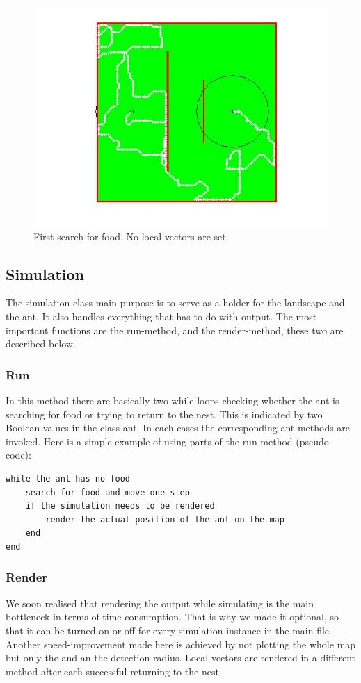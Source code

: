 \documentclass[11pt]{article}
\begin{document}
\begin{figure}[h!]
	\centering
	\includegraphics[scale=0.6]{images/foodsearch.jpg}
	\caption[Ants first search for food]{First search for food. No local vectors are set.}
\end{figure}
\subsection{Simulation}
The simulation class main purpose is to serve as a holder for the landscape and the ant. It also handles everything that has to do with output. The most important functions are the run-method, and the render-method, these two are described below.
\subsubsection{Run}
In this method there are basically two while-loops checking whether the ant is searching for food or trying to return to the nest. This is indicated by two Boolean values in the class ant. In each cases the corresponding ant-methods are invoked. Here is a simple example of using parts of the run-method (pseudo code):
\begin{lstlisting}
while the ant has no food
	search for food and move one step
	if the simulation needs to be rendered
		render the actual position of the ant on the map
	end
end
\end{lstlisting}

\subsubsection{Render} 
We soon realised that rendering the output while simulating is the main bottleneck in terms of time consumption. That is why we made it optional, so that it can be turned on or off for every simulation instance in the main-file. Another speed-improvement made here is achieved by not plotting the whole map but only the and an the detection-radius. Local vectors are rendered in a different method after each successful returning to the nest.
\end{document}
